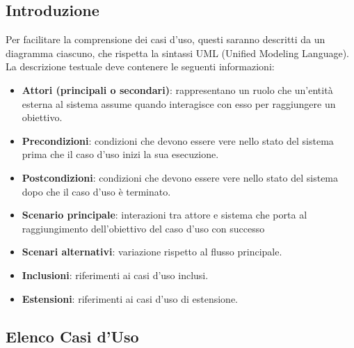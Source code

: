 \subsection{Introduzione}
Per facilitare la comprensione dei casi d'uso, questi saranno descritti da un diagramma ciascuno, che rispetta la sintassi UML (Unified Modeling Language).
La descrizione testuale deve contenere le seguenti informazioni:
\begin{itemize}
    \item \textbf{Attori (principali o secondari)}: rappresentano un ruolo che un'entità esterna al sistema assume quando interagisce con esso per raggiungere un obiettivo.
    \item \textbf{Precondizioni}: condizioni che devono essere vere nello stato del sistema prima che il caso d'uso inizi la sua esecuzione.
    \item \textbf{Postcondizioni}: condizioni che devono essere vere nello stato del sistema dopo che il caso d'uso è terminato.
    \item \textbf{Scenario principale}: interazioni tra attore e sistema che porta al raggiungimento dell'obiettivo del caso d'uso con successo
    \item \textbf{Scenari alternativi}: variazione rispetto al flusso principale.
    \item \textbf{Inclusioni}: riferimenti ai casi d'uso inclusi.
    \item \textbf{Estensioni}: riferimenti ai casi d'uso di estensione.
\end{itemize}

\subsection{Elenco Casi d'Uso}